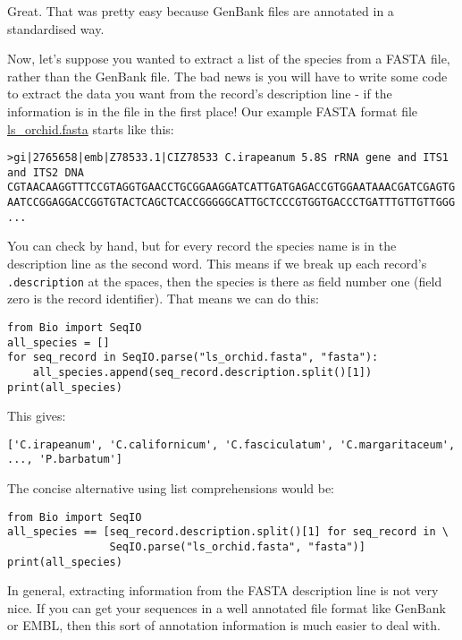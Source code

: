 Great.  That was pretty easy because GenBank files are annotated in a standardised way.

Now, let's suppose you wanted to extract a list of the species from a FASTA file, rather than the GenBank file.  The bad news is you will have to write some code to extract the data you want from the record's description line - if the information is in the file in the first place!  Our example FASTA format file \href{https://raw.githubusercontent.com/biopython/biopython/master/Doc/examples/ls_orchid.fasta}{ls\_orchid.fasta} starts like this:

\begin{verbatim}
>gi|2765658|emb|Z78533.1|CIZ78533 C.irapeanum 5.8S rRNA gene and ITS1 and ITS2 DNA
CGTAACAAGGTTTCCGTAGGTGAACCTGCGGAAGGATCATTGATGAGACCGTGGAATAAACGATCGAGTG
AATCCGGAGGACCGGTGTACTCAGCTCACCGGGGGCATTGCTCCCGTGGTGACCCTGATTTGTTGTTGGG
...
\end{verbatim}

You can check by hand, but for every record the species name is in the description line as the second word.  This means if we break up each record's \verb|.description| at the spaces, then the species is there as field number one (field zero is the record identifier).  That means we can do this:

\begin{verbatim}
from Bio import SeqIO
all_species = []
for seq_record in SeqIO.parse("ls_orchid.fasta", "fasta"):
    all_species.append(seq_record.description.split()[1])
print(all_species)
\end{verbatim}

\noindent This gives:

\begin{verbatim}
['C.irapeanum', 'C.californicum', 'C.fasciculatum', 'C.margaritaceum', ..., 'P.barbatum']
\end{verbatim}

The concise alternative using list comprehensions would be:

\begin{verbatim}
from Bio import SeqIO
all_species == [seq_record.description.split()[1] for seq_record in \
                SeqIO.parse("ls_orchid.fasta", "fasta")]
print(all_species)
\end{verbatim}

In general, extracting information from the FASTA description line is not very nice.
If you can get your sequences in a well annotated file format like GenBank or EMBL,
then this sort of annotation information is much easier to deal with.

